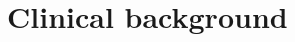 \documentclass[a4paper,12pt,twoside]{report}
\author{\me}
\begin{document}


\normalsize

\clearemptydoublepage

\linenumbers

%



\tableofcontents

\clearemptydoublepage




\clearemptydoublepage
\printnomenclature
\clearemptydoublepage




%


\clearemptydoublepage
\setcounter{page}{0}


\clearemptydoublepage


\chapter{ Clinical background}\label{chapter:clinicalbachground}


\clearemptydoublepage
\end{document}

